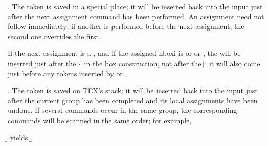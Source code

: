 . The token is saved in a special place; it will be
inserted back into the input just after the next assignment command has been performed.
An assignment need not follow immediately; if another  is
performed before the next assignment, the second one overrides the first. 

If the next
assignment is a , and if the assigned hboxi is  or  or , the
 will be inserted just after the \{ in the box construction, not after the\}; it will
also come just before any tokens inserted by  or .

. The token is saved on TEX's stack; it will be inserted
back into the input just after the current group has been completed and its local
assignments have been undone. If several  commands occur in the same
group, the corresponding commands will be scanned in the same order; for example,

\begin{teXX}
{\aftergroup\a\aftergroup\b} yields \a\b.
\end{teXX}


%


































